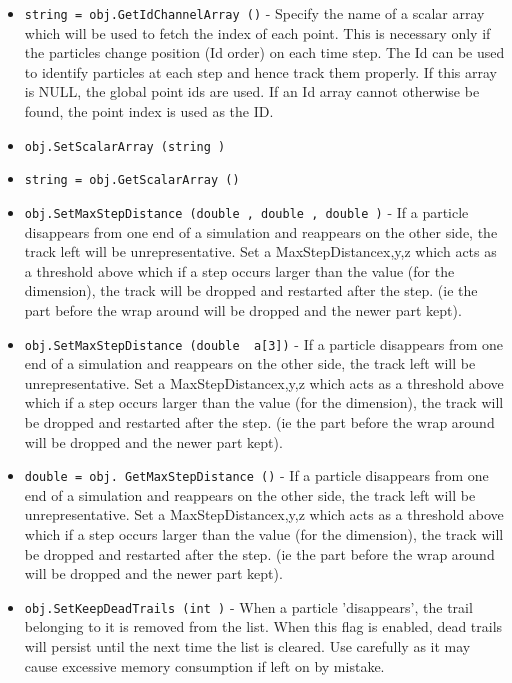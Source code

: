 \begin{itemize}
\item  \verb|string = obj.GetIdChannelArray ()| -  Specify the name of a scalar array which will be used to fetch
 the index of each point. This is necessary only if the particles
 change position (Id order) on each time step. The Id can be used
 to identify particles at each step and hence track them properly.
 If this array is NULL, the global point ids are used.  If an Id
 array cannot otherwise be found, the point index is used as the ID.

\item  \verb|obj.SetScalarArray (string )|

\item  \verb|string = obj.GetScalarArray ()|

\item  \verb|obj.SetMaxStepDistance (double , double , double )| -  If a particle disappears from one end of a simulation and reappears
 on the other side, the track left will be unrepresentative.
 Set a MaxStepDistance{x,y,z} which acts as a threshold above which
 if a step occurs larger than the value (for the dimension), the track will
 be dropped and restarted after the step. (ie the part before the wrap 
 around will be dropped and the newer part kept).

\item  \verb|obj.SetMaxStepDistance (double  a[3])| -  If a particle disappears from one end of a simulation and reappears
 on the other side, the track left will be unrepresentative.
 Set a MaxStepDistance{x,y,z} which acts as a threshold above which
 if a step occurs larger than the value (for the dimension), the track will
 be dropped and restarted after the step. (ie the part before the wrap 
 around will be dropped and the newer part kept).

\item  \verb|double = obj. GetMaxStepDistance ()| -  If a particle disappears from one end of a simulation and reappears
 on the other side, the track left will be unrepresentative.
 Set a MaxStepDistance{x,y,z} which acts as a threshold above which
 if a step occurs larger than the value (for the dimension), the track will
 be dropped and restarted after the step. (ie the part before the wrap 
 around will be dropped and the newer part kept).

\item  \verb|obj.SetKeepDeadTrails (int )| -  When a particle 'disappears', the trail belonging to it is removed from
 the list. When this flag is enabled, dead trails will persist
 until the next time the list is cleared. Use carefully as it may cause
 excessive memory consumption if left on by mistake.


\end{itemize}
